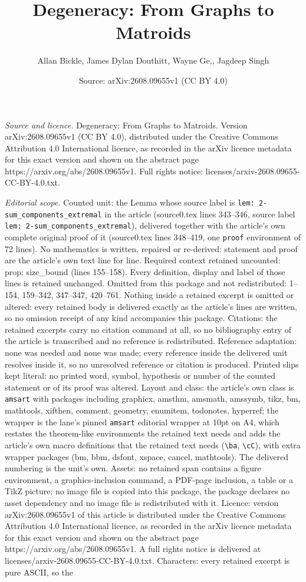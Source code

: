 \documentclass[10pt,a4paper]{amsart}
\title[Degeneracy: From Graphs to Matroids]{Degeneracy: From Graphs to Matroids}
\author{Allan Bickle, James Dylan Douthitt, Wayne Ge,, Jagdeep Singh}
\date{Source: arXiv:2608.09655v1 (CC BY 4.0)}
\begin{document}
\maketitle

\noindent\emph{Source and licence.} Degeneracy: From Graphs to Matroids. Version arXiv:2608.09655v1 (CC BY 4.0), distributed under the Creative Commons Attribution 4.0 International licence, as recorded in the arXiv licence metadata for this exact version and shown on the abstract page https://arxiv.org/abs/2608.09655v1. Full rights notice: licenses/arxiv-2608.09655-CC-BY-4.0.txt.\par\smallskip

\noindent\textit{Editorial scope.} Counted unit: the Lemma whose source label is \texttt{lem: 2-sum\_components\_extremal} in the article (source0.tex lines 343--346, source label \texttt{lem: 2-sum\_components\_extremal}), delivered together with the article's own complete original proof of it (source0.tex lines 348--419, one \texttt{proof} environment of 72 lines). No mathematics is written, repaired or re-derived: statement and proof are the article's own text line for line. Required context retained uncounted: prop: size\_bound (lines 155--158). Every definition, display and label of those lines is retained unchanged. Omitted from this package and not redistributed: 1--154, 159--342, 347--347, 420--761. Nothing inside a retained excerpt is omitted or altered: every retained body is delivered exactly as the article's lines are written, so no omission receipt of any kind accompanies this package. Citations: the retained excerpts carry no citation command at all, so no bibliography entry of the article is transcribed and no reference is redistributed. Reference adaptation: none was needed and none was made; every reference inside the delivered unit resolves inside it, so no unresolved reference or citation is produced. Printed slips kept literal: no printed word, symbol, hypothesis or number of the counted statement or of its proof was altered. Layout and class: the article's own class is \texttt{amsart} with packages including graphicx, amsthm, amsmath, amssymb, tikz, bm, mathtools, xifthen, comment, geometry, enumitem, todonotes, hyperref; the wrapper is the lane's pinned \texttt{amsart} editorial wrapper at 10pt on A4, which restates the theorem-like environments the retained text needs and adds the article's own macro definitions that the retained text needs (\texttt{\textbackslash ba}, \texttt{\textbackslash cC}), with extra wrapper packages (bm, bbm, dsfont, xspace, cancel, mathtools). The delivered numbering is the unit's own. Assets: no retained span contains a figure environment, a graphics-inclusion command, a PDF-page inclusion, a table or a TikZ picture; no image file is copied into this package, the package declares no asset dependency and no image file is redistributed with it. Licence: version arXiv:2608.09655v1 of this article is distributed under the Creative Commons Attribution 4.0 International licence, as recorded in the arXiv licence metadata for this exact version and shown on the abstract page https://arxiv.org/abs/2608.09655v1. A full rights notice is delivered at licenses/arxiv-2608.09655-CC-BY-4.0.txt. Characters: every retained excerpt is pure ASCII, so the 
\end{document}
